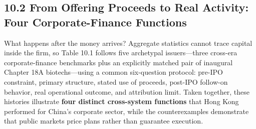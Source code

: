 \documentclass[11pt,letterpaper]{article}
\begin{document}
\subsection*{\texorpdfstring{10.2 From Offering Proceeds to Real Activity: Four Corporate-Finance Functions}{10.2 From Offering Proceeds to Real Activity: Four Corporate-Finance Functions}}
What happens after the money arrives? Aggregate statistics cannot trace capital inside the firm, so Table 10.1 follows five archetypal issuers—three cross-era corporate-finance benchmarks plus an explicitly matched pair of inaugural Chapter 18A biotechs—using a common six-question protocol: pre-IPO constraint, primary structure, stated use of proceeds, post-IPO follow-on behavior, real operational outcome, and attribution limit. Taken together, these histories illustrate \textbf{four distinct cross-system functions} that Hong Kong performed for China's corporate sector, while the counterexamples demonstrate that public markets price plans rather than guarantee execution.
\end{document}
